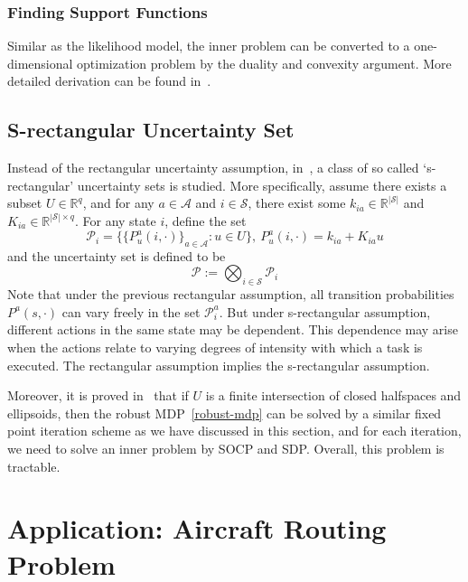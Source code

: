 \documentclass[11pt,reqno]{amsart}
\theoremstyle{definition}
\numberwithin{equation}{section}
\theoremstyle{remark}
\begin{document}
\subsubsection{Finding Support Functions}
Similar as the likelihood model, the inner problem can be converted to a one-dimensional optimization problem by the duality and convexity argument. More detailed derivation can be found in~\cite{nilim2005robust}.

\subsection{S-rectangular Uncertainty Set}Instead of the rectangular uncertainty assumption, in~\cite{wiesemann2013robust}, a class of so called `s-rectangular' uncertainty sets is studied. More specifically, assume there exists a subset $U\in\mathbb{R}^q$, and for any $a\in\mathcal{A}$ and $i\in\mathcal{S}$, there exist some $k_{ia}\in\mathbb{R}^{|\mathcal{S}|}$ and $K_{ia}\in\mathbb{R}^{|\mathcal{S}|\times q}$. For any state $i$, define the set 
\begin{equation}
    \mathcal{P}_i=\{\{P_u^a(i,\cdot)\}_{a\in\mathcal{A}}:u\in U\},~P_u^a(i,\cdot)=k_{ia}+K_{ia}u
\end{equation}
and the uncertainty set is defined to be
\begin{equation}
    \mathcal{P}:=\bigotimes_{i\in\mathcal{S}}\mathcal{P}_i
\end{equation}
Note that under the previous rectangular assumption, all transition probabilities $P^a(s,\cdot)$ can vary freely in the set $\mathcal{P}_i^a$. But under s-rectangular assumption, different actions in the same state may be dependent. This dependence may arise when the actions relate to varying degrees of intensity with which a task is executed. The rectangular assumption implies the s-rectangular assumption.

\medskip

Moreover, it is proved in~\cite{wiesemann2013robust} that if $U$ is a finite intersection of closed halfspaces and ellipsoids, then the robust MDP~\ref{robust-mdp} can be solved by a similar fixed point iteration scheme as we have discussed in this section, and for each iteration, we need to solve an inner problem by SOCP and SDP. Overall, this problem is tractable.


\section{Application: Aircraft Routing Problem}
\end{document}
